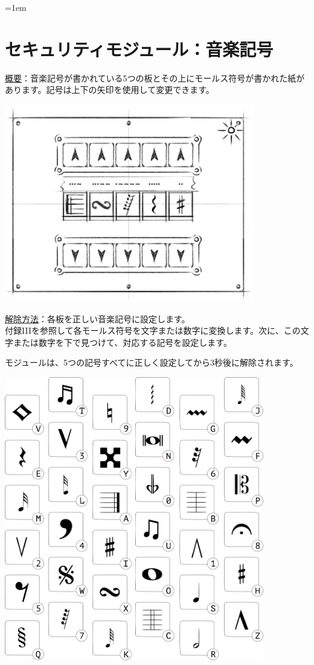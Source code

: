 \begin{minipage}{0.63\textwidth}
    \parskip=1em
    \section*{セキュリティモジュール：音楽記号}
    
    \uline{概要}：音楽記号が書かれている5つの板とその上にモールス符号が書かれた紙があります。記号は上下の矢印を使用して変更できます。
\end{minipage}%
\hfill%
\begin{minipage}{0.33\textwidth}
    \includegraphics[width=\textwidth]{images/54.png}
    \vspace*{\fill}
\end{minipage}
    
\uline{解除方法}：各板を正しい音楽記号に設定します。\\付録IIIを参照して各モールス符号を文字または数字に変換します。次に{、}この文字または数字を下で見つけて{、}対応する記号を設定します。

モジュールは{、}5つの記号すべてに正しく設定してから3秒後に解除されます。

\begin{center}
    \includegraphics[width=0.85\textwidth]{images/52.png}
\end{center}
